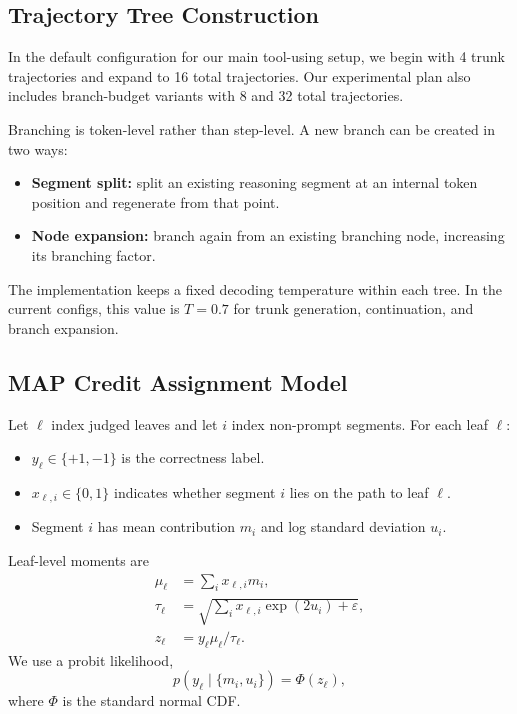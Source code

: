\documentclass[letterpaper]{article} %
\begin{document}
\subsection{Trajectory Tree Construction}
In the default configuration for our main tool-using setup, we begin with 4 trunk trajectories and expand to 16 total trajectories. Our experimental plan also includes branch-budget variants with 8 and 32 total trajectories.

Branching is token-level rather than step-level. A new branch can be created in two ways:
\begin{itemize}
    \item \textbf{Segment split:} split an existing reasoning segment at an internal token position and regenerate from that point.
    \item \textbf{Node expansion:} branch again from an existing branching node, increasing its branching factor.
\end{itemize}

The implementation keeps a fixed decoding temperature within each tree. In the current configs, this value is $T=0.7$ for trunk generation, continuation, and branch expansion.

\subsection{MAP Credit Assignment Model}
Let $\ell$ index judged leaves and let $i$ index non-prompt segments. For each leaf $\ell$:
\begin{itemize}
    \item $y_\ell \in \{+1,-1\}$ is the correctness label.
    \item $x_{\ell,i} \in \{0,1\}$ indicates whether segment $i$ lies on the path to leaf $\ell$.
    \item Segment $i$ has mean contribution $m_i$ and log standard deviation $u_i$.
\end{itemize}

Leaf-level moments are
\begin{align}
\mu_\ell &= \sum_i x_{\ell,i} m_i, \\
\tau_\ell &= \sqrt{\sum_i x_{\ell,i} \exp(2u_i) + \varepsilon}, \\
z_\ell &= y_\ell \mu_\ell / \tau_\ell.
\end{align}
We use a probit likelihood,
\begin{equation}
p(y_\ell \mid \{m_i,u_i\}) = \Phi(z_\ell),
\end{equation}
where $\Phi$ is the standard normal CDF.
\end{document}
